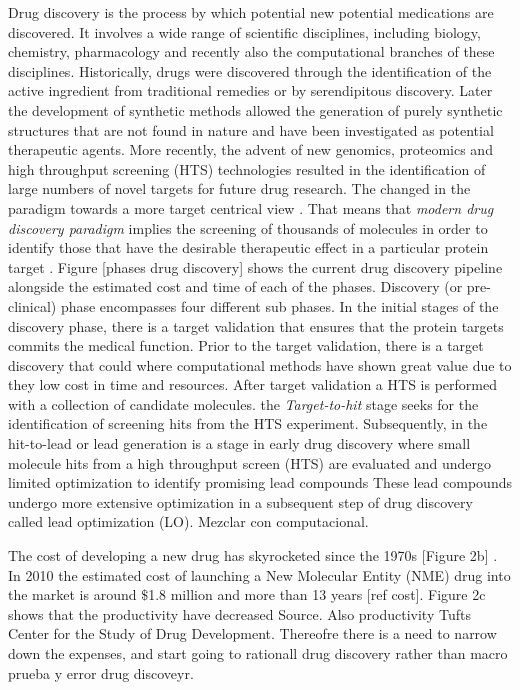 \documentclass[12pt, a4paper,twoside]{tesi_upf}
\begin{document}
\par Drug discovery is the process by which potential new potential medications are discovered. It involves a wide range of scientific disciplines, including biology, chemistry, pharmacology and recently also the computational branches of these disciplines. Historically, drugs were discovered through the identification of the active ingredient from traditional remedies or by serendipitous discovery. Later the development of synthetic methods allowed the generation of purely synthetic structures that are not found in nature and have been investigated as potential therapeutic agents. More recently, the advent of new genomics, proteomics and high throughput screening (HTS) technologies resulted in the identification of large numbers of novel targets for future drug research.  The changed in the paradigm towards a more target centrical view \cite{Drews2000, Patrick2001}.  That means that \textit{modern drug discovery paradigm} implies the screening of thousands of molecules in order to identify those that have the desirable therapeutic effect in a particular protein target \cite{Drews2000, Patrick2001}. Figure [phases drug discovery] shows the current drug discovery pipeline alongside the estimated cost and time of each of the phases.  Discovery (or pre-clinical) phase encompasses four different sub phases. In the  initial stages of the discovery phase, there is a target validation  that ensures that the protein targets commits the medical function. Prior to the target validation, there is a target discovery that could where computational methods have shown great value due to they low cost in time and resources. After target validation a HTS is performed with a collection of candidate molecules.  the  \textit{Target-to-hit}  stage seeks for the identification of screening hits from the HTS experiment.   Subsequently, in the hit-to-lead or lead generation is a stage in early drug discovery where small molecule hits from a high throughput screen (HTS) are evaluated and undergo limited optimization to identify promising lead compounds
These lead compounds undergo more extensive optimization in a subsequent step of drug discovery called lead optimization (LO). Mezclar con computacional. 



\par The cost of developing a new drug has skyrocketed since the 1970s [Figure 2b] . In 2010 the estimated cost of launching a New Molecular Entity (NME) drug into the market is around  $\$$1.8 million and more than 13 years [ref cost].  Figure 2c shows that the productivity have decreased Source. Also productivity Tufts Center for the Study of Drug Development. Thereofre there is a need to narrow down the expenses, and start going to rationall drug discovery rather than macro prueba y error drug discoveyr. 
\end{document}
